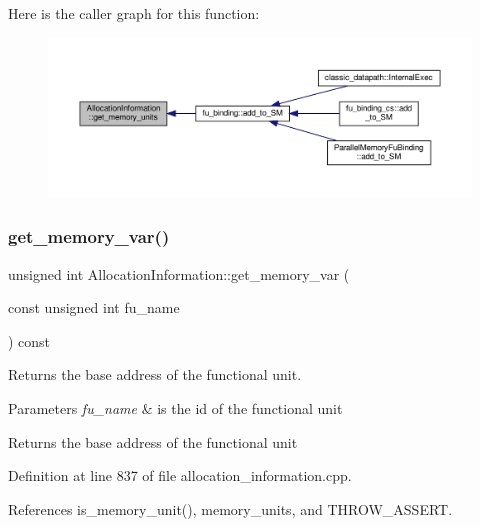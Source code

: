Here is the caller graph for this function\+:
\nopagebreak
\begin{figure}[H]
\begin{center}
\leavevmode
\includegraphics[width=350pt]{d7/d79/classAllocationInformation_a57e73fc90d331eb1b943123f1bba095e_icgraph}
\end{center}
\end{figure}
\mbox{\label{classAllocationInformation_aca7d9a076d5c26ffe60388b0b59a9903}} 
\subsubsection{\texorpdfstring{get\+\_\+memory\+\_\+var()}{get\_memory\_var()}}
{\footnotesize\ttfamily unsigned int Allocation\+Information\+::get\+\_\+memory\+\_\+var (\begin{DoxyParamCaption}\item[{const unsigned int}]{fu\+\_\+name }\end{DoxyParamCaption}) const}



Returns the base address of the functional unit. 


\begin{DoxyParams}{Parameters}
{\em fu\+\_\+name} & is the id of the functional unit \\
\hline
\end{DoxyParams}
\begin{DoxyReturn}{Returns}
the base address of the functional unit 
\end{DoxyReturn}


Definition at line 837 of file allocation\+\_\+information.\+cpp.



References is\+\_\+memory\+\_\+unit(), memory\+\_\+units, and T\+H\+R\+O\+W\+\_\+\+A\+S\+S\+E\+RT.



